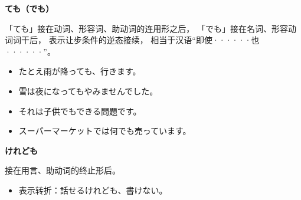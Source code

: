 {\bf
\noindent ても（でも）
}

「ても」接在动词、形容词、助动词的连用形之后，
「でも」接在名词、形容动词词干后，
表示让步条件的逆态接续，
相当于汉语``即使······也······''。
\begin{itemize}
  \item たとえ雨が降っても、行きます。
  \item 雪は夜になってもやみませんでした。
  \item それは子供でもできる問題です。
  \item スーパーマーケットでは何でも売っています。
\end{itemize}


{\bf
\noindent けれども
}

接在用言、助动词的终止形后。
\begin{itemize}
  \item 表示转折：話せるけれども、書けない。
\end{itemize}
